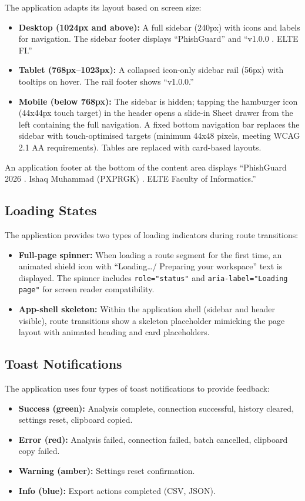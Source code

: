 The application adapts its layout based on screen size:
\begin{itemize}
\item \textbf{Desktop (1024px and above):} A full sidebar (240px) with icons and labels for navigation. The sidebar footer displays ``PhishGuard'' and ``v1.0.0 . ELTE FI.''
\item \textbf{Tablet (768px--1023px):} A collapsed icon-only sidebar rail (56px) with tooltips on hover. The rail footer shows ``v1.0.0.''
\item \textbf{Mobile (below 768px):} The sidebar is hidden; tapping the hamburger icon (44x44px touch target) in the header opens a slide-in Sheet drawer from the left containing the full navigation. A fixed bottom navigation bar replaces the sidebar with touch-optimised targets (minimum 44x48 pixels, meeting WCAG 2.1 AA requirements). Tables are replaced with card-based layouts.
\end{itemize}

An application footer at the bottom of the content area displays ``PhishGuard \textcopyright{} 2026 . Ishaq Muhammad (PXPRGK) . ELTE Faculty of Informatics.''

\subsection{Loading States}

The application provides two types of loading indicators during route transitions:
\begin{itemize}
\item \textbf{Full-page spinner:} When loading a route segment for the first time, an animated shield icon with ``Loading\ldots / Preparing your workspace'' text is displayed. The spinner includes \texttt{role="status"} and \texttt{aria-label="Loading page"} for screen reader compatibility.
\item \textbf{App-shell skeleton:} Within the application shell (sidebar and header visible), route transitions show a skeleton placeholder mimicking the page layout with animated heading and card placeholders.
\end{itemize}

\subsection{Toast Notifications}

The application uses four types of toast notifications to provide feedback:
\begin{itemize}
\item \textbf{Success (green):} Analysis complete, connection successful, history cleared, settings reset, clipboard copied.
\item \textbf{Error (red):} Analysis failed, connection failed, batch cancelled, clipboard copy failed.
\item \textbf{Warning (amber):} Settings reset confirmation.
\item \textbf{Info (blue):} Export actions completed (CSV, JSON).
\end{itemize}

